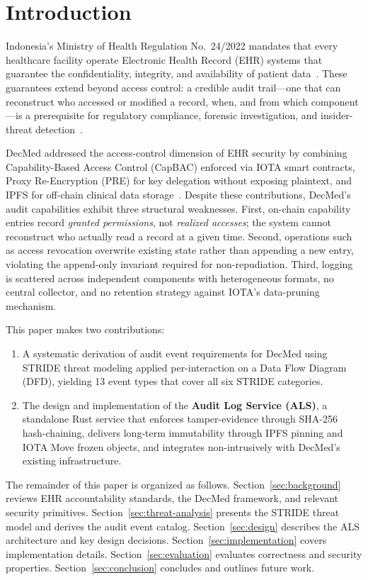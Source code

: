 \section{Introduction}
\label{sec:introduction}

Indonesia's Ministry of Health Regulation No.\ 24/2022 mandates that every
healthcare facility operate Electronic Health Record (EHR) systems that
guarantee the confidentiality, integrity, and availability of patient
data~\cite{permenkes24_2022}. These guarantees extend beyond access control:
a credible audit trail---one that can reconstruct who accessed or modified a
record, when, and from which component---is a prerequisite for regulatory
compliance, forensic investigation, and insider-threat
detection~\cite{cert2022insiderthreat}.

DecMed addressed the access-control dimension of EHR security by combining
Capability-Based Access Control (CapBAC) enforced via IOTA smart contracts,
Proxy Re-Encryption (PRE) for key delegation without exposing plaintext, and
IPFS for off-chain clinical data storage~\cite{DecMed}. Despite these
contributions, DecMed's audit capabilities exhibit three structural
weaknesses. First, on-chain capability entries record \emph{granted
permissions}, not \emph{realized accesses}; the system cannot reconstruct who
actually read a record at a given time. Second, operations such as access
revocation overwrite existing state rather than appending a new entry,
violating the append-only invariant required for non-repudiation. Third,
logging is scattered across independent components with heterogeneous formats,
no central collector, and no retention strategy against IOTA's data-pruning
mechanism.

This paper makes two contributions:
\begin{enumerate}
    \item A systematic derivation of audit event requirements for DecMed using
    STRIDE threat modeling applied per-interaction on a Data Flow Diagram
    (DFD), yielding 13 event types that cover all six STRIDE categories.

    \item The design and implementation of the \textbf{Audit Log Service
    (ALS)}, a standalone Rust service that enforces tamper-evidence through
    SHA-256 hash-chaining, delivers long-term immutability through IPFS
    pinning and IOTA Move frozen objects, and integrates non-intrusively with
    DecMed's existing infrastructure.
\end{enumerate}

The remainder of this paper is organized as follows. Section~\ref{sec:background}
reviews EHR accountability standards, the DecMed framework, and relevant
security primitives. Section~\ref{sec:threat-analysis} presents the STRIDE
threat model and derives the audit event catalog. Section~\ref{sec:design}
describes the ALS architecture and key design decisions.
Section~\ref{sec:implementation} covers implementation details.
Section~\ref{sec:evaluation} evaluates correctness and security properties.
Section~\ref{sec:conclusion} concludes and outlines future work.